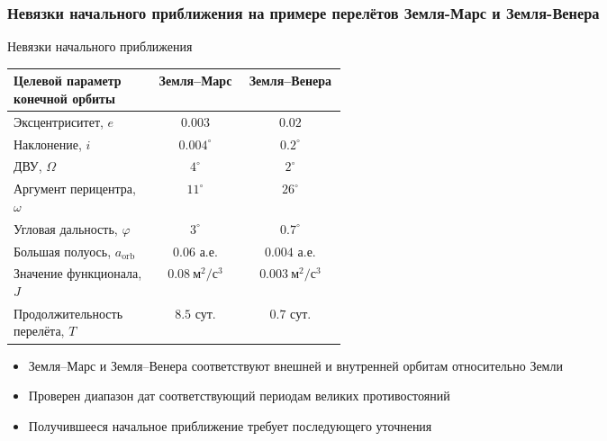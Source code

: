 \begin{frame}[t]
    \frametitle{Невязки начального приближения на примере перелётов Земля-Марс и Земля-Венера}
    \presentationtextsize
    \centering
    Невязки начального приближения
    \begin{tabular}{@{}p{0.43\linewidth}cc@{}}
        \toprule
        Целевой параметр конечной орбиты & Земля--Марс & Земля--Венера \\
        \midrule
        Эксцентриситет, \(e\) & \(0.003\) & \(0.02\) \\
        Наклонение, \(i\) & \(0.004^\circ\) & \(0.2^\circ\) \\
        ДВУ, \(\Omega\) & \(4^\circ\) & \(2^\circ\) \\
        Аргумент перицентра, \(\omega\) & \(11^\circ\) & \(26^\circ\) \\
        Угловая дальность, \(\varphi\) & \(3^\circ\) & \(0.7^\circ\) \\
        Большая полуось, \(a_{\mathrm{orb}}\) & \(0.06\) а.е. & \(0.004\) а.е. \\
        Значение функционала, \(J\) & \(0.08\ \mathrm{м^2/с^3}\) & \(0.003\ \mathrm{м^2/с^3}\) \\
        Продолжительность перелёта, \(T\) & \(8.5\) сут. & \(0.7\) сут. \\
        \bottomrule
    \end{tabular}
    \begin{itemize}
        \item Земля--Марс и Земля--Венера соответствуют внешней и внутренней орбитам относительно Земли
        \item Проверен диапазон дат соответствующий периодам великих противостояний
        \item Получившееся начальное приближение требует последующего уточнения
    \end{itemize}
\end{frame}
